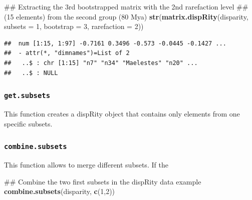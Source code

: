 \documentclass[]{book}
\newenvironment{Shaded}{\begin{snugshade}}{\end{snugshade}}
\newcommand{\KeywordTok}[1]{\textcolor[rgb]{0.13,0.29,0.53}{\textbf{#1}}}
\newcommand{\DataTypeTok}[1]{\textcolor[rgb]{0.13,0.29,0.53}{#1}}
\newcommand{\DecValTok}[1]{\textcolor[rgb]{0.00,0.00,0.81}{#1}}
\newcommand{\StringTok}[1]{\textcolor[rgb]{0.31,0.60,0.02}{#1}}
\newcommand{\OperatorTok}[1]{\textcolor[rgb]{0.81,0.36,0.00}{\textbf{#1}}}
\newcommand{\NormalTok}[1]{#1}
\theoremstyle{definition}
\theoremstyle{definition}
\theoremstyle{remark}
\begin{document}
\begin{Shaded}
\begin{Highlighting}[]
\NormalTok{## Extracting the 3rd bootstrapped matrix with the 2nd rarefaction level}
\NormalTok{## (15 elements) from the second group (80 Mya)}
\KeywordTok{str}\NormalTok{(}\KeywordTok{matrix.dispRity}\NormalTok{(disparity, }\DataTypeTok{subsets =} \DecValTok{1}\NormalTok{, }\DataTypeTok{bootstrap =} \DecValTok{3}\NormalTok{, }\DataTypeTok{rarefaction =} \DecValTok{2}\NormalTok{))}
\end{Highlighting}
\end{Shaded}

\begin{verbatim}
##  num [1:15, 1:97] -0.7161 0.3496 -0.573 -0.0445 -0.1427 ...
##  - attr(*, "dimnames")=List of 2
##   ..$ : chr [1:15] "n7" "n34" "Maelestes" "n20" ...
##   ..$ : NULL
\end{verbatim}

\subsubsection{\texorpdfstring{\texttt{get.subsets}}{get.subsets}}\label{get.subsets}

This function creates a dispRity object that contains only elements from
one specific subsets.

\begin{Shaded}
\end{Shaded}

\subsubsection{\texorpdfstring{\texttt{combine.subsets}}{combine.subsets}}\label{combine.subsets}

This function allows to merge different subsets. If the

\begin{Shaded}
\begin{Highlighting}[]
\NormalTok{## Combine the two first subsets in the dispRity data example}
\KeywordTok{combine.subsets}\NormalTok{(disparity, }\KeywordTok{c}\NormalTok{(}\DecValTok{1}\NormalTok{,}\DecValTok{2}\NormalTok{))}
\end{Highlighting}
\end{Shaded}
\end{document}
